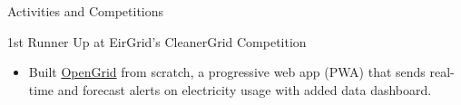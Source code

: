 \documentclass{article}
\newlength{\tabin}
\newlength{\secsep}
\newcommand{\lineunder}{\vspace*{-8pt} \\ \hspace*{-6pt} \hrulefill \\ \vspace*{-15pt}}
\newenvironment{tabbedsection}[1]{
  \begin{list}{}{
      \setlength{\itemsep}{0pt}
      \setlength{\labelsep}{0pt}
      \setlength{\labelwidth}{0pt}
      \setlength{\leftmargin}{\tabin}
      \setlength{\rightmargin}{\tabin}
      \setlength{\listparindent}{0pt}
      \setlength{\parsep}{0pt}
      \setlength{\parskip}{0pt}
      \setlength{\partopsep}{0pt}
      \setlength{\topsep}{#1}
    }
  \item[]
}{\end{list}}
\newenvironment{resume_section}[1]{
  \filbreak
  \vspace{2\secsep}
  \textsc{\large#1}
  \lineunder
  \begin{tabbedsection}{\secsep}
}{\end{tabbedsection}}
\newenvironment{resume_subsection}[2][]{
  \textbf{#2} \hfill {\footnotesize #1} \hspace{2em}
  \begin{tabbedsection}{0.5\secsep}
}{\end{tabbedsection}}
\newenvironment{subitems}{
  \renewcommand{\labelitemi}{-}
  \begin{itemize}
      \setlength{\labelsep}{1em}
}{\end{itemize}}
\begin{document}
\begin{resume_section}{Activities and Competitions}
  \begin{resume_subsection}{{1st Runner Up at EirGrid's CleanerGrid Competition}}
    \begin{subitems}
      \item Built \href{https://opengrid.marcustut.me}{OpenGrid} from scratch, a progressive web app (PWA) that sends real-time and forecast alerts on electricity usage with added data dashboard.
    \end{subitems}
  \end{resume_subsection}
  




\end{resume_section}
\end{document}
